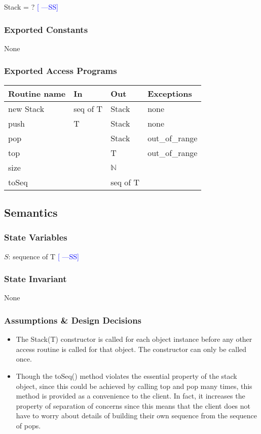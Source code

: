 \documentclass[12pt]{article}
\newcommand{\authornote}[3]{\textcolor{#1}{[#3 ---#2]}}
\newcommand{\authornote}[3]{}
\newcommand{\wss}[1]{\authornote{blue}{SS}{#1}}
\begin{document}
Stack = ? \wss{}

\subsubsection* {Exported Constants}

None

\subsubsection* {Exported Access Programs}

\begin{tabular}{| l | l | l | p{5cm} |}
\hline
\textbf{Routine name} & \textbf{In} & \textbf{Out} & \textbf{Exceptions}\\
\hline
new Stack & seq of T & Stack & none\\
\hline
push & T & Stack & none\\
\hline
pop & & Stack & out\_of\_range\\
\hline
top & & T & out\_of\_range\\
\hline
size & & $\mathbb{N}$ & \\
\hline
toSeq& & seq of T & \\
\hline
\end{tabular}

\subsection* {Semantics}

\subsubsection* {State Variables}

$S$: sequence of T \wss{}

\subsubsection* {State Invariant}

None

\subsubsection* {Assumptions \& Design Decisions}

\begin{itemize}
\item The Stack(T) constructor is called for each object instance before any
  other access routine is called for that object.  The constructor can only be
  called once.
\item Though the toSeq() method violates the essential property of the stack
  object, since this could be achieved by calling top and pop many times, this
  method is provided as a convenience to the client. In fact, it increases the
  property of separation of concerns since this means that the client does not
  have to worry about details of building their own sequence from the sequence
  of pops.
\end{itemize}
\end{document}
